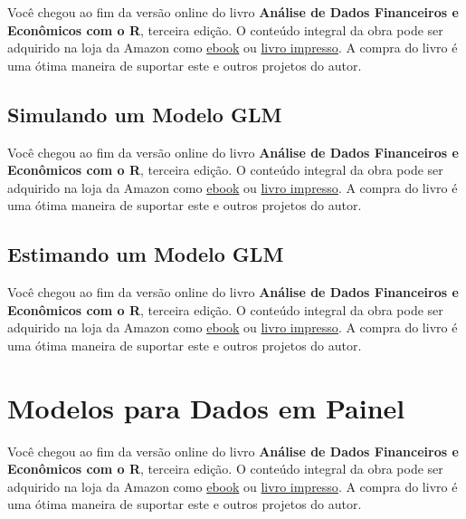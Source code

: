 \documentclass[
  11pt,
]{book}
\newenvironment{pleasebuyit}
{\begin{noteblock}
		
	} {\end{noteblock}}
\begin{document}
\begin{pleasebuyit}
Você chegou ao fim da versão online do livro \textbf{Análise de Dados
Financeiros e Econômicos com o R}, terceira edição. O conteúdo integral
da obra pode ser adquirido na loja da Amazon como
\href{https://www.amazon.com.br/dp/B08WNC27ZY}{ebook} ou
\href{https://www.amazon.com/dp/B08WP8CCDB}{livro impresso}. A compra do
livro é uma ótima maneira de suportar este e outros projetos do autor.
\end{pleasebuyit}

\hypertarget{simulando-um-modelo-glm}{%
\subsection{Simulando um Modelo GLM}\label{simulando-um-modelo-glm}}

\begin{pleasebuyit}
Você chegou ao fim da versão online do livro \textbf{Análise de Dados
Financeiros e Econômicos com o R}, terceira edição. O conteúdo integral
da obra pode ser adquirido na loja da Amazon como
\href{https://www.amazon.com.br/dp/B08WNC27ZY}{ebook} ou
\href{https://www.amazon.com/dp/B08WP8CCDB}{livro impresso}. A compra do
livro é uma ótima maneira de suportar este e outros projetos do autor.
\end{pleasebuyit}

\hypertarget{estimando-um-modelo-glm}{%
\subsection{Estimando um Modelo GLM}\label{estimando-um-modelo-glm}}

\begin{pleasebuyit}
Você chegou ao fim da versão online do livro \textbf{Análise de Dados
Financeiros e Econômicos com o R}, terceira edição. O conteúdo integral
da obra pode ser adquirido na loja da Amazon como
\href{https://www.amazon.com.br/dp/B08WNC27ZY}{ebook} ou
\href{https://www.amazon.com/dp/B08WP8CCDB}{livro impresso}. A compra do
livro é uma ótima maneira de suportar este e outros projetos do autor.
\end{pleasebuyit}

\hypertarget{modelos-para-dados-em-painel}{%
\section{Modelos para Dados em Painel}\label{modelos-para-dados-em-painel}}

\begin{pleasebuyit}
Você chegou ao fim da versão online do livro \textbf{Análise de Dados
Financeiros e Econômicos com o R}, terceira edição. O conteúdo integral
da obra pode ser adquirido na loja da Amazon como
\href{https://www.amazon.com.br/dp/B08WNC27ZY}{ebook} ou
\href{https://www.amazon.com/dp/B08WP8CCDB}{livro impresso}. A compra do
livro é uma ótima maneira de suportar este e outros projetos do autor.
\end{pleasebuyit}
\end{document}
